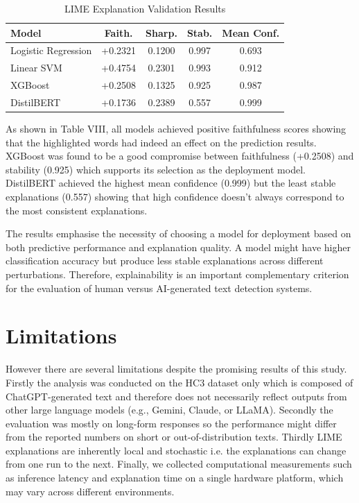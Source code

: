 \documentclass[conference]{IEEEtran}
\begin{document}
\begin{table}[htbp]
\caption{LIME Explanation Validation Results}
\label{tab:lime_validation}
\centering
\footnotesize
\begin{tabular}{lcccc}
\hline
Model & Faith. & Sharp. & Stab. & Mean Conf. \\
\hline
Logistic Regression & +0.2321 & 0.1200 & 0.997 & 0.693 \\
Linear SVM & +0.4754 & 0.2301 & 0.993 & 0.912 \\
XGBoost & +0.2508 & 0.1325 & 0.925 & 0.987 \\
DistilBERT & +0.1736 & 0.2389 & 0.557 & 0.999 \\
\hline
\end{tabular}
\end{table}


As shown in Table VIII, all models achieved positive faithfulness scores showing that the highlighted words had indeed an effect on the prediction results. XGBoost was found to be a good compromise between faithfulness (+0.2508) and stability (0.925) which supports its selection as the deployment model. DistilBERT achieved the highest mean confidence (0.999) but the least stable explanations (0.557) showing that high confidence doesn’t always correspond to the most consistent explanations.

The results emphasise the necessity of choosing a model for deployment based on both predictive performance and explanation quality. A model might have higher classification accuracy but produce less stable explanations across different perturbations. Therefore, explainability is an important complementary criterion for the evaluation of human versus AI-generated text detection systems.



\section{Limitations}


However there are several limitations despite the promising results of this study. Firstly the analysis was conducted on the HC3 dataset only which is composed of ChatGPT-generated text and therefore does not necessarily reflect outputs from other large language models (e.g., Gemini, Claude, or LLaMA). Secondly the evaluation was mostly on long-form responses so the performance might differ from the reported numbers on short or out-of-distribution texts. Thirdly LIME explanations are inherently local and stochastic i.e. the explanations can change from one run to the next. Finally, we collected computational measurements such as inference latency and explanation time on a single hardware platform, which may vary across different environments.
\end{document}
